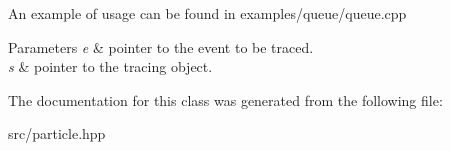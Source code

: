 An example of usage can be found in examples/queue/queue.\+cpp


\begin{DoxyParams}{Parameters}
{\em e} & pointer to the event to be traced. \\
\hline
{\em s} & pointer to the tracing object. \\
\hline
\end{DoxyParams}


The documentation for this class was generated from the following file\+:\begin{DoxyCompactItemize}
\item 
src/particle.\+hpp\end{DoxyCompactItemize}

